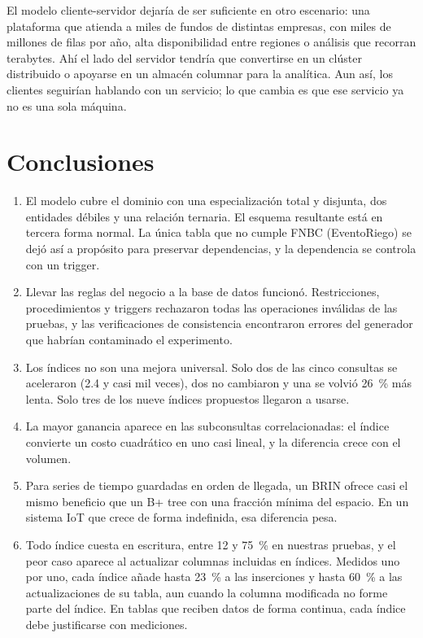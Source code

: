 \documentclass[11pt,letterpaper]{article}
\newcommand{\tbus}{\textunderscore\allowbreak}
\newcommand{\tb}[1]{{\ttfamily\let\_\tbus #1}}
\begin{document}
El modelo cliente-servidor dejaría de ser suficiente en otro escenario: una plataforma que atienda a miles de fundos de distintas empresas, con miles de millones de filas por año, alta disponibilidad entre regiones o análisis que recorran terabytes. Ahí el lado del servidor tendría que convertirse en un clúster distribuido o apoyarse en un almacén columnar para la analítica. Aun así, los clientes seguirían hablando con un servicio; lo que cambia es que ese servicio ya no es una sola máquina.

\section{Conclusiones}

\begin{enumerate}[leftmargin=1.6em,itemsep=0.25em]
\item El modelo cubre el dominio con una especialización total y disjunta, dos entidades débiles y una relación ternaria. El esquema resultante está en tercera forma normal. La única tabla que no cumple FNBC (\tb{Evento\_Riego}) se dejó así a propósito para preservar dependencias, y la dependencia se controla con un trigger.
\item Llevar las reglas del negocio a la base de datos funcionó. Restricciones, procedimientos y triggers rechazaron todas las operaciones inválidas de las pruebas, y las verificaciones de consistencia encontraron errores del generador que habrían contaminado el experimento.
\item Los índices no son una mejora universal. Solo dos de las cinco consultas se aceleraron (2.4 y casi mil veces), dos no cambiaron y una se volvió 26~\% más lenta. Solo tres de los nueve índices propuestos llegaron a usarse.
\item La mayor ganancia aparece en las subconsultas correlacionadas: el índice convierte un costo cuadrático en uno casi lineal, y la diferencia crece con el volumen.
\item Para series de tiempo guardadas en orden de llegada, un BRIN ofrece casi el mismo beneficio que un B+ tree con una fracción mínima del espacio. En un sistema IoT que crece de forma indefinida, esa diferencia pesa.
\item Todo índice cuesta en escritura, entre 12 y 75~\% en nuestras pruebas, y el peor caso aparece al actualizar columnas incluidas en índices. Medidos uno por uno, cada índice añade hasta 23~\% a las inserciones y hasta 60~\% a las actualizaciones de su tabla, aun cuando la columna modificada no forme parte del índice. En tablas que reciben datos de forma continua, cada índice debe justificarse con mediciones.

\end{enumerate}
\end{document}
